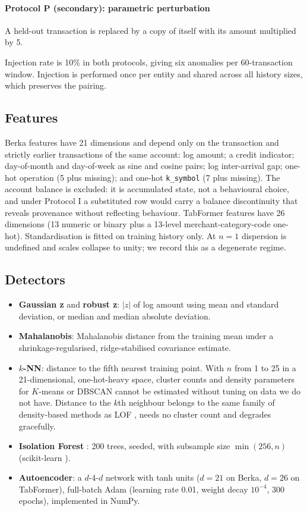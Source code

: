 \paragraph{Protocol P (secondary): parametric perturbation}
A held-out transaction is replaced by a copy of itself with its amount multiplied by 5.

Injection rate is 10\% in both protocols, giving six anomalies per 60-transaction window. Injection is performed once per entity and shared across all history sizes, which preserves the pairing.

\subsection{Features}
Berka features have 21 dimensions and depend only on the transaction and strictly earlier transactions of the same account: log amount; a credit indicator; day-of-month and day-of-week as sine and cosine pairs; log inter-arrival gap; one-hot operation (5 plus missing); and one-hot \texttt{k\_symbol} (7 plus missing). The account balance is excluded: it is accumulated state, not a behavioural choice, and under Protocol I a substituted row would carry a balance discontinuity that reveals provenance without reflecting behaviour. TabFormer features have 26 dimensions (13 numeric or binary plus a 13-level merchant-category-code one-hot). Standardisation is fitted on training history only. At $n=1$ dispersion is undefined and scales collapse to unity; we record this as a degenerate regime.

\subsection{Detectors}
\begin{itemize}
\item \textbf{Gaussian z} and \textbf{robust z}: $|z|$ of log amount using mean and standard deviation, or median and median absolute deviation.
\item \textbf{Mahalanobis}: Mahalanobis distance from the training mean under a shrinkage-regularised, ridge-stabilised covariance estimate.
\item \textbf{$k$-NN}: distance to the fifth nearest training point. With $n$ from 1 to 25 in a 21-dimensional, one-hot-heavy space, cluster counts and density parameters for $K$-means or DBSCAN cannot be estimated without tuning on data we do not have. Distance to the $k$th neighbour belongs to the same family of density-based methods as LOF \cite{breunig2000lof}, needs no cluster count and degrades gracefully.
\item \textbf{Isolation Forest} \cite{liu2008isolation}: 200 trees, seeded, with subsample size $\min(256,n)$ (scikit-learn \cite{pedregosa2011scikit}).
\item \textbf{Autoencoder}: a $d$-4-$d$ network with tanh units ($d=21$ on Berka, $d=26$ on TabFormer), full-batch Adam (learning rate 0.01, weight decay $10^{-4}$, 300 epochs), implemented in NumPy.
\end{itemize}

